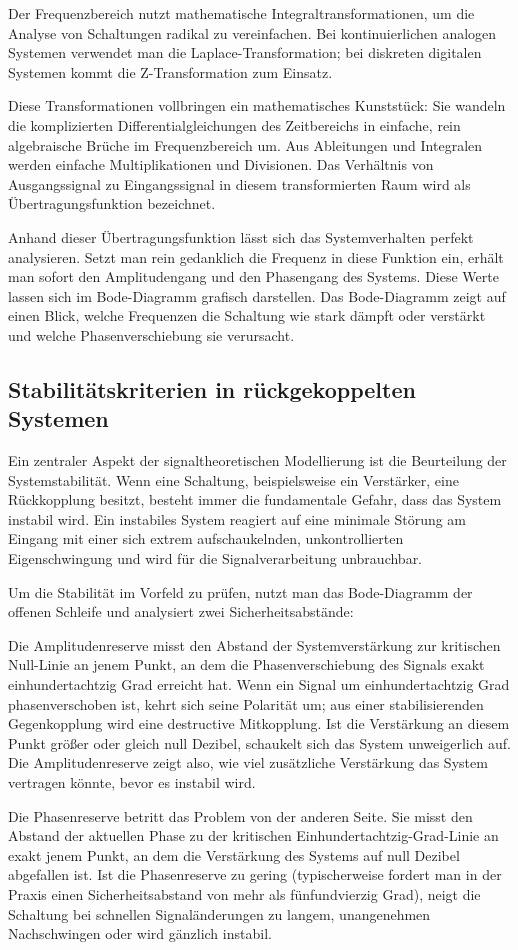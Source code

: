 \documentclass[11pt,a4paper]{article}
\begin{document}
Der Frequenzbereich nutzt mathematische Integraltransformationen, um die Analyse von Schaltungen radikal zu vereinfachen. Bei kontinuierlichen analogen Systemen verwendet man die Laplace-Transformation; bei diskreten digitalen Systemen kommt die Z-Transformation zum Einsatz.

Diese Transformationen vollbringen ein mathematisches Kunststück: Sie wandeln die komplizierten Differentialgleichungen des Zeitbereichs in einfache, rein algebraische Brüche im Frequenzbereich um. Aus Ableitungen und Integralen werden einfache Multiplikationen und Divisionen. Das Verhältnis von Ausgangssignal zu Eingangssignal in diesem transformierten Raum wird als Übertragungsfunktion bezeichnet.

Anhand dieser Übertragungsfunktion lässt sich das Systemverhalten perfekt analysieren. Setzt man rein gedanklich die Frequenz in diese Funktion ein, erhält man sofort den Amplitudengang und den Phasengang des Systems. Diese Werte lassen sich im Bode-Diagramm grafisch darstellen. Das Bode-Diagramm zeigt auf einen Blick, welche Frequenzen die Schaltung wie stark dämpft oder verstärkt und welche Phasenverschiebung sie verursacht.

\subsection{Stabilitätskriterien in rückgekoppelten Systemen}

Ein zentraler Aspekt der signaltheoretischen Modellierung ist die Beurteilung der Systemstabilität. Wenn eine Schaltung, beispielsweise ein Verstärker, eine Rückkopplung besitzt, besteht immer die fundamentale Gefahr, dass das System instabil wird. Ein instabiles System reagiert auf eine minimale Störung am Eingang mit einer sich extrem aufschaukelnden, unkontrollierten Eigenschwingung und wird für die Signalverarbeitung unbrauchbar.

Um die Stabilität im Vorfeld zu prüfen, nutzt man das Bode-Diagramm der offenen Schleife und analysiert zwei Sicherheitsabstände:

Die Amplitudenreserve misst den Abstand der Systemverstärkung zur kritischen Null-Linie an jenem Punkt, an dem die Phasenverschiebung des Signals exakt einhundertachtzig Grad erreicht hat. Wenn ein Signal um einhundertachtzig Grad phasenverschoben ist, kehrt sich seine Polarität um; aus einer stabilisierenden Gegenkopplung wird eine destructive Mitkopplung. Ist die Verstärkung an diesem Punkt größer oder gleich null Dezibel, schaukelt sich das System unweigerlich auf. Die Amplitudenreserve zeigt also, wie viel zusätzliche Verstärkung das System vertragen könnte, bevor es instabil wird.

Die Phasenreserve betritt das Problem von der anderen Seite. Sie misst den Abstand der aktuellen Phase zu der kritischen Einhundertachtzig-Grad-Linie an exakt jenem Punkt, an dem die Verstärkung des Systems auf null Dezibel abgefallen ist. Ist die Phasenreserve zu gering (typischerweise fordert man in der Praxis einen Sicherheitsabstand von mehr als fünfundvierzig Grad), neigt die Schaltung bei schnellen Signaländerungen zu langem, unangenehmen Nachschwingen oder wird gänzlich instabil.
\end{document}
